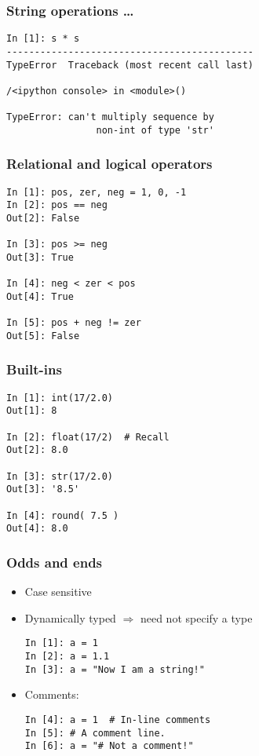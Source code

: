 \documentclass[14pt,compress]{beamer}
\newcounter{time}
\newcommand{\inctime}[1]{\addtocounter{time}{#1}{\tiny \thetime\ m}}
\begin{document}
\begin{frame}[fragile]
  \frametitle{String operations \ldots}
  \begin{lstlisting}
In [1]: s * s
--------------------------------------------
TypeError  Traceback (most recent call last)

/<ipython console> in <module>()

TypeError: can't multiply sequence by
                non-int of type 'str'
  \end{lstlisting}
\end{frame}

\begin{frame}[fragile]
  \frametitle{Relational and logical operators}
  \begin{lstlisting}
In [1]: pos, zer, neg = 1, 0, -1
In [2]: pos == neg
Out[2]: False

In [3]: pos >= neg
Out[3]: True

In [4]: neg < zer < pos
Out[4]: True

In [5]: pos + neg != zer
Out[5]: False
  \end{lstlisting}
\end{frame}

\begin{frame}[fragile]
  \frametitle{Built-ins}
  \begin{lstlisting}
In [1]: int(17/2.0)
Out[1]: 8

In [2]: float(17/2)  # Recall
Out[2]: 8.0

In [3]: str(17/2.0)
Out[3]: '8.5'

In [4]: round( 7.5 )
Out[4]: 8.0
  \end{lstlisting}
\end{frame}

\begin{frame}[fragile]
  \frametitle{Odds and ends}
  \begin{itemize}
    \item Case sensitive
    \item Dynamically typed $\Rightarrow$ need not specify a type
      \begin{lstlisting}
In [1]: a = 1
In [2]: a = 1.1
In [3]: a = "Now I am a string!"
      \end{lstlisting}
    \item Comments:
      \begin{lstlisting}
In [4]: a = 1  # In-line comments
In [5]: # A comment line.
In [6]: a = "# Not a comment!"
      \end{lstlisting}
  \end{itemize}
  \inctime{15}
\end{frame}
\end{document}
